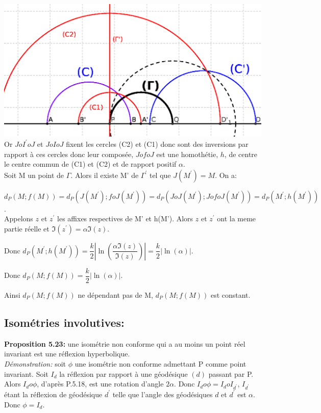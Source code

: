 \documentclass[a4paper, 12pt, twoside]{book}
\begin{document}
 
  \includegraphics[scale=0.7]{figures/isom26.eps}\\
 
   Or $JoI^{'}oJ$ et $JoIoJ$ fixent les cercles (C2) et (C1) donc sont des inversions par rapport à ces cercles donc leur composée, $JofoJ$ est une homothétie, $h$, de centre le centre commun de (C1) et (C2) et de rapport positif $\alpha$.\\
 
 Soit M un point de $\Gamma$. Alors il existe M' de $\Gamma^{'}$ tel que $J(M^{'})=M$. On a:\
 
  $d_{P}(M; f(M))=d_{P}(J(M^{'}); foJ(M^{'}))=d_{P}(JoJ(M^{'}); JofoJ(M^{'}))=d_{P}(M^{'}; h(M^{'}))$. \\
  
 Appelons $z$ et $z^{'}$ les affixes respectives de M' et h(M'). Alors $z$ et $z^{'}$ ont la meme partie réelle et $\Im(z^{'})=\alpha\Im(z)$. \
 
  Donc $d_{P}(M^{'}; h(M^{'}))=\dfrac{k}{2} |\ln(\dfrac{\alpha\Im(z)}{\Im(z)})|=\dfrac{k}{2} |\ln(\alpha)|$. \
  
  Donc  $d_{P}(M; f(M))=\dfrac{k}{2} |\ln(\alpha)|$.    \
  
  Ainsi $d_{P}(M; f(M))$ ne dépendant pas de M, $d_{P}(M; f(M))$ est constant.\\
  
  \subsection{Isométries involutives:}
  
  \textbf{Proposition 5.23:} une isométrie non conforme qui a au moins un point réel invariant est une réflexion hyperbolique.\\
  
  \textit{Démonstration:} soit $\phi$ une isométrie non conforme admettant P comme point invariant. Soit $I_{d}$ la réflexion par rapport à une géodésique $(d)$ passant par P. Alors $I_{d}o\phi$, d'après P.5.18, est une rotation d'angle $2\alpha$. Donc $I_{d}o\phi= I_{d}oI_{d^{'}}$,  $I_{d^{'}}$ étant la réflexion de géodésique $d^{'}$ telle que l'angle des géodésiques $d$ et $d^{'}$ est $\alpha$. Donc $\phi=I_{d}$.\\
  
\end{document}
